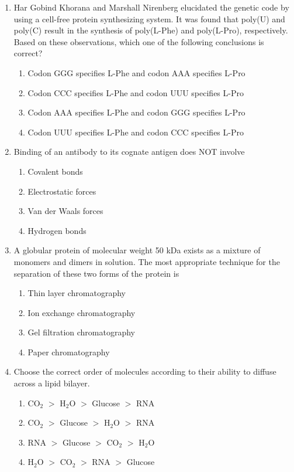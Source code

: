 \documentclass[journal,12pt,onecolumn]{IEEEtran}
\begin{document}
\begin{enumerate}[label=\arabic*.]
\item Har Gobind Khorana and Marshall Nirenberg elucidated the genetic code by using a cell-free protein synthesizing system. It was found that poly(U) and poly(C) result in the synthesis of poly(L-Phe) and poly(L-Pro), respectively. Based on these observations, which one of the following conclusions is correct?

\begin{enumerate}[label=(\Alph*)]
    \item Codon GGG specifies L-Phe and codon AAA specifies L-Pro
    \item Codon CCC specifies L-Phe and codon UUU specifies L-Pro
    \item Codon AAA specifies L-Phe and codon GGG specifies L-Pro
    \item Codon UUU specifies L-Phe and codon CCC specifies L-Pro
\end{enumerate}

\item Binding of an antibody to its cognate antigen does NOT involve
\begin{multicols}{2}
\begin{enumerate}[label=(\Alph*)]
    \item Covalent bonds
    \item Electrostatic forces
    \item Van der Waals forces
    \item Hydrogen bonds
\end{enumerate}
\end{multicols}

\item A globular protein of molecular weight 50 kDa exists as a mixture of monomers and dimers in solution. The most appropriate technique for the separation of these two forms of the protein is
\begin{multicols}{2}
\begin{enumerate}[label=(\Alph*)]
    \item Thin layer chromatography
    \item Ion exchange chromatography
    \item Gel filtration chromatography
    \item Paper chromatography
\end{enumerate}
\end{multicols}

\item Choose the correct order of molecules according to their ability to diffuse across a lipid bilayer.
\begin{multicols}{2}
\begin{enumerate}[label=(\Alph*)]
    \item CO$_2$ $>$ H$_2$O $>$ Glucose $>$ RNA
    \item CO$_2$ $>$ Glucose $>$ H$_2$O $>$ RNA
    \item RNA $>$ Glucose $>$ CO$_2$ $>$ H$_2$O
    \item H$_2$O $>$ CO$_2$ $>$ RNA $>$ Glucose
\end{enumerate}
\end{multicols}


\end{enumerate}
\end{document}
